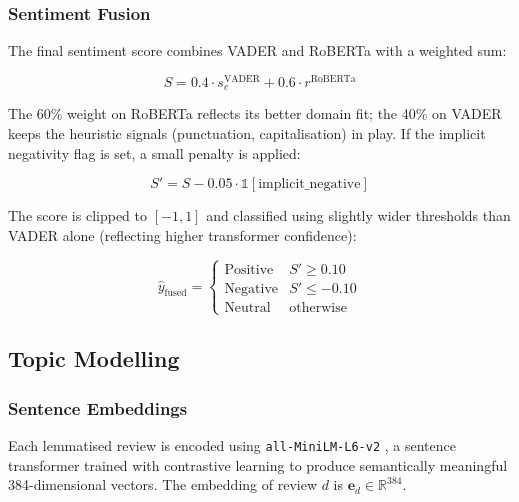 \subsubsection{Sentiment Fusion}
\begin{justify}
The final sentiment score combines VADER and RoBERTa with a weighted sum:

\begin{equation}
    \boxed{S = 0.4 \cdot s_c^{\text{VADER}} + 0.6 \cdot r^{\text{RoBERTa}}}
    \label{eq:fusion}
\end{equation}

The 60\% weight on RoBERTa reflects its better domain fit; the 40\% on VADER keeps the heuristic signals (punctuation, capitalisation) in play. If the implicit negativity flag is set, a small penalty is applied:

\begin{equation}
    S' = S - 0.05 \cdot \mathbb{1}[\text{implicit\_negative}]
\end{equation}

The score is clipped to $[-1, 1]$ and classified using slightly wider thresholds than VADER alone (reflecting higher transformer confidence):

\begin{equation}
    \hat{y}_{\text{fused}} = \begin{cases} \text{Positive} & S' \geq 0.10 \\ \text{Negative} & S' \leq -0.10 \\ \text{Neutral} & \text{otherwise} \end{cases}
\end{equation}
\end{justify}

\subsection{Topic Modelling}

\subsubsection{Sentence Embeddings}
\begin{justify}
Each lemmatised review is encoded using \texttt{all-MiniLM-L6-v2} \cite{reimers2019sentencebert}, a sentence transformer trained with contrastive learning to produce semantically meaningful 384-dimensional vectors. The embedding of review $d$ is $\mathbf{e}_d \in \mathbb{R}^{384}$.
\end{justify}

